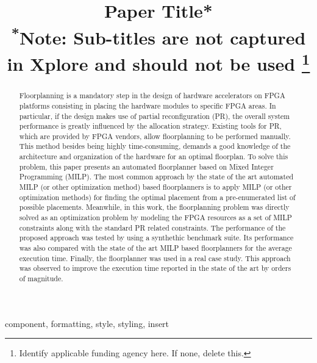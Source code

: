 \documentclass[conference]{IEEEtran}
\begin{document}
\title{Paper Title*\\
{\footnotesize \textsuperscript{*}Note: Sub-titles are not captured in Xplore and
should not be used}
\thanks{Identify applicable funding agency here. If none, delete this.}
}

\author{
\and
{}
}

\maketitle

\begin{abstract}
Floorplanning is a mandatory step in the design of hardware accelerators on FPGA platforms consisting in placing the hardware modules to specific FPGA areas. In particular, if the design makes use of partial reconfiguration (PR), the overall system performance is greatly influenced by the allocation strategy. Existing tools for PR, which are provided by FPGA vendors, allow floorplanning to be performed manually. This method besides being highly time-consuming, demands a good knowledge of the architecture and organization of the hardware for an optimal floorplan. To solve this problem, this paper presents an automated floorplanner based on Mixed Integer Programming (MILP). The most common approach by the state of the art automated MILP (or other optimization method) based floorplanners is to apply MILP (or other optimization methods) for finding the optimal placement from a pre-enumerated list of possible placements. Meanwhile, in this work, the floorplanning problem was directly solved as an optimization problem by modeling the FPGA resources as a set of MILP constraints along with the standard PR related constraints. The performance of the proposed approach was tested by using a synthethic benchmark suite. Its performance was also compared with the state of the art MILP based floorplanners for the average execution time. Finally, the floorplanner was used in a real case study. This approach was observed to improve the execution time reported in the state of the art by orders of magnitude.
\end{abstract}

\begin{IEEEkeywords}
component, formatting, style, styling, insert
\end{IEEEkeywords}







\end{document}
